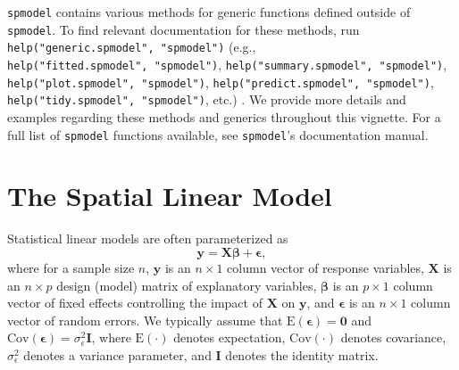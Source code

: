 \documentclass[10pt,letterpaper]{article}
\begin{document}
\texttt{spmodel} contains various methods for generic functions defined
outside of \texttt{spmodel}. To find relevant documentation for these
methods, run \texttt{help("generic.spmodel",\ "spmodel")} (e.g.,
\texttt{help("fitted.spmodel",\ "spmodel")},
\texttt{help("summary.spmodel",\ "spmodel")},
\texttt{help("plot.spmodel",\ "spmodel")},
\texttt{help("predict.spmodel",\ "spmodel")},
\texttt{help("tidy.spmodel",\ "spmodel")}, etc.) . We provide more
details and examples regarding these methods and generics throughout
this vignette. For a full list of \texttt{spmodel} functions available,
see \texttt{spmodel}'s documentation manual.

\hypertarget{sec:theomodel}{%
\section{The Spatial Linear Model}\label{sec:theomodel}}

Statistical linear models are often parameterized as
\begin{equation}\label{eq:lm}
 \mathbf{y} = \mathbf{X} \boldsymbol{\beta} + \boldsymbol{\epsilon},
\end{equation} where for a sample size \(n\), \(\mathbf{y}\) is an
\(n \times 1\) column vector of response variables, \(\mathbf{X}\) is an
\(n \times p\) design (model) matrix of explanatory variables,
\(\boldsymbol{\beta}\) is an \(p \times 1\) column vector of fixed
effects controlling the impact of \(\mathbf{X}\) on \(\mathbf{y}\), and
\(\boldsymbol{\epsilon}\) is an \(n \times 1\) column vector of random
errors. We typically assume that
\(\text{E}(\boldsymbol{\epsilon}) = \mathbf{0}\) and
\(\text{Cov}(\boldsymbol{\epsilon}) = \sigma^2_\epsilon \mathbf{I}\),
where \(\text{E}(\cdot)\) denotes expectation, \(\text{Cov}(\cdot)\)
denotes covariance, \(\sigma^2_\epsilon\) denotes a variance parameter,
and \(\mathbf{I}\) denotes the identity matrix.
\end{document}
